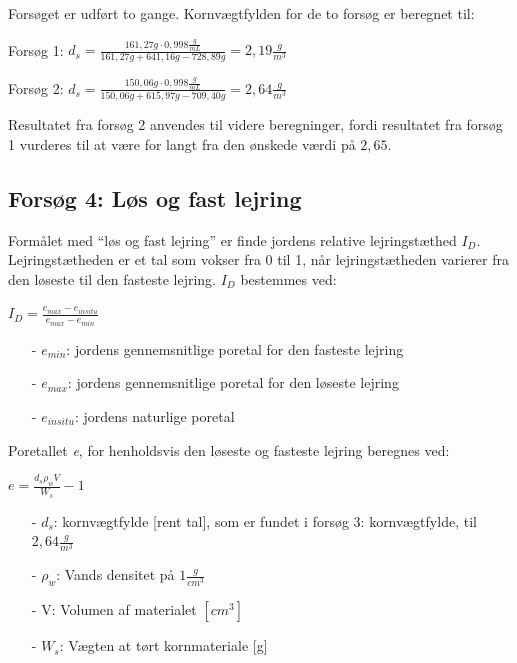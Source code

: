 Forsøget er udført to gange. Kornvægtfylden for de to forsøg er beregnet til:

\begin{center}
	Forsøg 1: $d_{s} = \frac{161,\!27 g \cdot 0,\!998 \frac{g}{mL}}{161,\!27 g + 641,\!16 g - 728,\!89 g} = 2,\!19 \frac{g}{m^3}$
\end{center}
\begin{center}
	Forsøg 2: $d_{s} = \frac{150,\!06 g \cdot 0,\!998 \frac{g}{mL}}{150,\!06 g + 615,\!97 g - 709,\!40 g} = 2,\!64 \frac{g}{m^3}$
\end{center} 

Resultatet fra forsøg 2 anvendes til videre beregninger, fordi resultatet fra forsøg 1 vurderes til at være for langt fra den ønskede værdi på $2,\!65$.

\subsection{Forsøg 4: Løs og fast lejring}
Formålet med “løs og fast lejring” er finde jordens relative lejringstæthed $I_D$. Lejringstætheden er et tal som vokser fra 0 til 1, når lejringstætheden varierer fra den løseste til den fasteste lejring.
\newline
\newline
$I_D$ bestemmes ved:

\begin{center}
	$I_D = \frac{e_{max} - e_{in situ}}{e_{max} - e_{min}}$
\end{center}

\begin{itemize}
	\item[-] $e_{min}$: jordens gennemsnitlige poretal for den fasteste lejring 
	\item[-] $e_{max}$: jordens gennemsnitlige poretal for den løseste lejring
	\item[-] $e_{in situ}$: jordens naturlige poretal 
\end{itemize}

Poretallet \textit{e}, for henholdsvis den løseste og fasteste lejring beregnes ved:

\begin{center}
	$e = \frac{d_s \rho_w  V}{W_s} - 1$
\end{center}

\begin{itemize}
	\item[-] $d_s$: kornvægtfylde [rent tal], som er fundet i forsøg 3: kornvægtfylde, til $2,\!64 \frac{g}{m^3}$ 
	\item[-] $\rho_w$: Vands densitet på $1 \frac{g}{cm^3}$
	\item[-] V: Volumen af materialet $[cm^3]$
	\item[-] $W_s$: Vægten at tørt kornmateriale [g]
\end{itemize}

